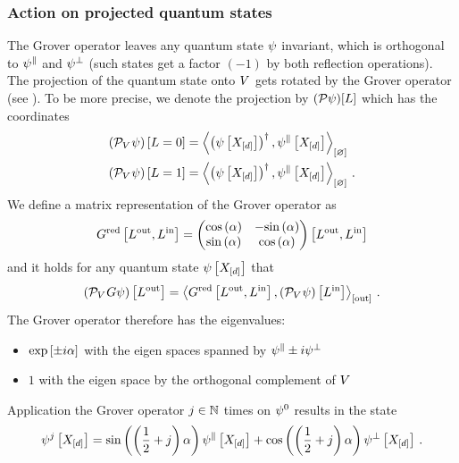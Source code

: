 \subsubsection{Action on projected quantum states}

The Grover operator leaves any quantum state $\psi$ invariant, which is orthogonal to $\psi^{\parallel}$ and $\psi^{\perp}$ (such states get a factor $(-1)$ by both reflection operations).
The projection of the quantum state onto $V^{}$ gets rotated by the Grover operator (see ).
To be more precise, we denote the projection by $(\mathcal{P}\psi)[L]$ which has the coordinates
\begin{align*}
    \left(\mathcal{P}_{V^{}}\psi\right)\left[L=0\right]
    &= \left\langle \left(\psi\left[X_{[d]}\right]\right)^{\dagger},\psi^{\parallel}\left[X_{[d]}\right]\right\rangle_{\left[ \varnothing \right]}\\
    \left(\mathcal{P}_{V^{}}\psi\right)\left[L=1\right]
    &= \left\langle \left(\psi\left[X_{[d]}\right]\right)^{\dagger},\psi^{\parallel}\left[X_{[d]}\right]\right\rangle_{\left[ \varnothing \right]} \, .
\end{align*}
We define a matrix representation of the Grover operator as
\begin{align*}
    G^{\mathrm{red}}\left[L^{\mathrm{out}},L^{\mathrm{in}}\right]
    = \begin{pmatrix} 
        \mathrm{cos}\left(\alpha\right) & -\mathrm{sin}\left(\alpha\right) \\
        \mathrm{sin}\left(\alpha\right) & \mathrm{cos}\left(\alpha\right)
     \end{pmatrix}\left[L^{\mathrm{out}},L^{\mathrm{in}}\right]
\end{align*}
and it holds for any quantum state $\psi\left[X_{[d]}\right]$ that
\begin{align*}
    \left(\mathcal{P}_{V^{}}G\psi\right)\left[L^{\mathrm{out}}\right]
    = \left\langle G^{\mathrm{red}}\left[L^{\mathrm{out}},L^{\mathrm{in}}\right],
        \left(\mathcal{P}_{V^{}}\psi\right)\left[L^{\mathrm{in}}\right]
    \right\rangle_{\left[ \mathrm{out} \right]} \, .
\end{align*}
The Grover operator therefore has the eigenvalues:
\begin{itemize}
    \item $\mathrm{exp}\left[\pm i \alpha\right]$ with the eigen spaces spanned by $\psi^{\parallel}\pm i \psi^{\perp}$
    \item $1$ with the eigen space by the orthogonal complement of $V^{}$
\end{itemize}
Application the Grover operator $j\in\mathbb{N}$ times on $\psi^{0}$ results in the state
\begin{align*}
    \psi^{j}\left[X_{[d]}\right]
    = \mathrm{sin}\left(\left(\frac{1}{2}+j\right)\alpha\right) \psi^{\parallel}\left[X_{[d]}\right]
    + \mathrm{cos}\left(\left(\frac{1}{2}+j\right)\alpha\right) \psi^{\perp}\left[X_{[d]}\right] \, .
\end{align*}

